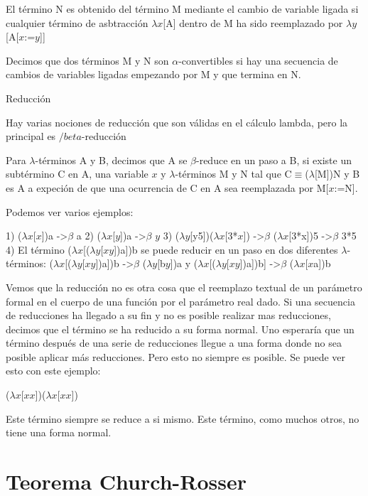 \begin{definition}
  El término N es obtenido del término M mediante el cambio de variable ligada si cualquier término de asbtracción $\lambda$$x$[A] dentro de M ha sido reemplazado por $\lambda$$y$[A[$x$:=$y$]]
\end{definition}

Decimos que dos términos M y N son $\alpha$-convertibles si hay una secuencia de cambios de variables ligadas empezando por M y que termina en N.


Reducción

Hay varias nociones de reducción que son válidas en el cálculo lambda, pero la principal es $/beta$-reducción

\begin{definition}
  Para $\lambda$-términos A y B, decimos que A se $\beta$-reduce en un paso a B, si existe un subtérmino C en A, una variable $x$ y $\lambda$-términos M y N tal que C$\equiv$($\lambda$[M])N y B es A a expeción de que una ocurrencia de C en A sea reemplazada por M[$x$:=N].
\end{definition}

Podemos ver varios ejemplos:

1) ($\lambda$$x$[$x$])a ->$\beta$ a
2) ($\lambda$$x$[$y$])a ->$\beta$ $y$
3) ($\lambda$$y$[y5])($\lambda$$x$[3*$x$]) ->$\beta$ ($\lambda$$x$[3*x])5 ->$\beta$ 3*5
4) El término ($\lambda$$x$[($\lambda$$y$[$x$$y$])a])b se puede reducir en un paso en dos diferentes $\lambda$-términos:
($\lambda$$x$[($\lambda$$y$[$x$$y$])a])b ->$\beta$ ($\lambda$$y$[b$y$])a
y
($\lambda$$x$[($\lambda$$y$[$x$$y$])a])b] ->$\beta$ ($\lambda$$x$[$x$a])b

Vemos que la reducción no es otra cosa que el reemplazo textual de un parámetro formal en el cuerpo de una función por el parámetro real dado. Si una secuencia de reducciones ha llegado a su fin y no es posible realizar mas reducciones, decimos que el término se ha reducido a su forma normal.
Uno esperaría que un término después de una serie de reducciones llegue a una forma donde no sea posible aplicar más reducciones. Pero esto no siempre es posible. Se puede ver esto con este ejemplo:

($\lambda$$x$[$x$$x$])($\lambda$$x$[$x$$x$])

Este término siempre se reduce a si mismo. Este término, como muchos otros, no tiene una forma normal.

\section{Teorema Church-Rosser}

